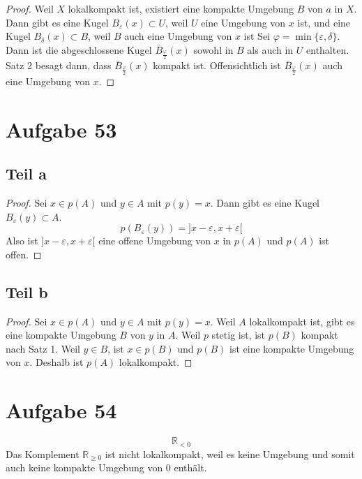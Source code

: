 \documentclass[10pt,a4paper]{article}
\begin{document}
\begin{proof}
  Weil $X$ lokalkompakt ist, existiert eine kompakte Umgebung $B$ von $a$ in $X$.
  Dann gibt es eine Kugel $B_{\varepsilon}(x) \subset U$, weil $U$ eine Umgebung von $x$ ist, und eine Kugel $B_{\delta}(x) \subset B$, weil $B$ auch eine Umgebung von $x$ ist
  Sei $\varphi = \min \{ \varepsilon, \delta \}$.
  Dann ist die abgeschlossene Kugel $\bar{B}_{\frac{\varphi}{2}}(x)$ sowohl in $B$ als auch in $U$ enthalten.
  Satz 2 besagt dann, dass $\bar{B}_{\frac{\varphi}{2}}(x)$ kompakt ist.
  Offensichtlich ist $\bar{B}_{\frac{\varphi}{2}}(x)$ auch eine Umgebung von $x$.
\end{proof}

\section{Aufgabe 53}

\subsection{Teil a}

\begin{proof}
  Sei $x \in p(A)$ und $y \in A$ mit $p(y) = x$.
  Dann gibt es eine Kugel $B_{\varepsilon}(y) \subset A$.
  \begin{equation}
    p(B_{\varepsilon}(y)) = ]x - \varepsilon, x + \varepsilon[
  \end{equation}
  Also ist $]x - \varepsilon, x + \varepsilon[$ eine offene Umgebung von $x$ in $p(A)$ und $p(A)$ ist offen.
\end{proof}

\subsection{Teil b}

\begin{proof}
  Sei $x \in p(A)$ und $y \in A$ mit $p(y) = x$.
  Weil $A$ lokalkompakt ist, gibt es eine kompakte Umgebung $B$ von $y$ in $A$.
  Weil $p$ stetig ist, ist $p(B)$ kompakt nach Satz 1.
  Weil $y \in B$, ist $x \in p(B)$ und $p(B)$ ist eine kompakte Umgebung von $x$.
  Deshalb ist $p(A)$ lokalkompakt.
\end{proof}

\section{Aufgabe 54}

\begin{equation}
  \mathbb{R}_{< 0}
\end{equation}
Das Komplement $\mathbb{R}_{\ge 0}$ ist nicht lokalkompakt, weil es keine Umgebung und somit auch keine kompakte Umgebung von $0$ enthält.
\end{document}
